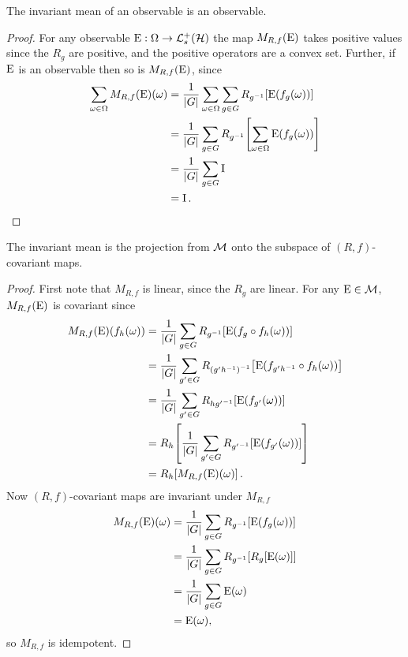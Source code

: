 \begin{lem}\label{lem:inv-mean-obs-to-obs}
  The invariant mean of an observable is an observable.
  \begin{proof}
    For any observable $\ope:\Omega\to\posops[\hcal]$ the map $M_{R,f}(\operatorname{E})$ takes positive values since the $R_g$ are positive, and the positive operators are a convex set. Further, if $\operatorname{E}$ is an observable then so is $M_{R,f}(\operatorname{E})$, since
    \begin{align}
      \sum_{\omega\in\Omega} M_{R,f}(\operatorname{E})(\omega) &= \frac{1}{{\left\lvert{G}\right\rvert}} \sum_{\omega\in\Omega} \sum_{g\in G} R_{g^{-1}}\! \left[\operatorname{E}(f_g(\omega))\right]\\
                                                   &= \frac{1}{{\left\lvert{G}\right\rvert}} \sum_{g\in G} R_{g^{-1}}\! \left[\sum_{\omega\in\Omega}\operatorname{E}(f_g(\omega))\right]\\
                                                   &= \frac{1}{{\left\lvert{G}\right\rvert}} \sum_{g\in G} \operatorname{I}\\
                                                   &= \operatorname{I}.
    \end{align}
  \end{proof}
\end{lem}
\begin{lem}\label{lem:inv-mean-proj}
  The invariant mean is the projection from $\mathcal{M}$ onto the subspace of $(R,f)$-covariant maps.
  \begin{proof}
    First note that $M_{R,f}$ is linear, since the $R_g$ are linear. For any $\operatorname{E}\in\mathcal{M}$, $M_{R,f}(\operatorname{E})$ is covariant since
    \begin{align}
      M_{R,f}(\operatorname{E})(f_h(\omega)) &= \frac{1}{{\left\lvert{G}\right\rvert}} \sum_{g\in G} R_{g^{-1}}\! \left[\operatorname{E}(f_g\circ f_h(\omega))\right]\\
                                 &= \frac{1}{{\left\lvert{G}\right\rvert}} \sum_{g^\prime\in G} R_{{(g^\prime h^{-1})}^{-1}}\! \left[\operatorname{E}(f_{g^\prime h^{-1}}\circ f_h(\omega))\right]\\
                                 &= \frac{1}{{\left\lvert{G}\right\rvert}} \sum_{g^\prime\in G} R_{h{g^\prime}^{-1}} \! \left[\operatorname{E}(f_{g^\prime}(\omega))\right]\\
                                 &= R_h\!\left[\frac{1}{{\left\lvert{G}\right\rvert}} \sum_{g^\prime\in G} R_{{g^\prime}^{-1}} \! \left[\operatorname{E}(f_{g^\prime}(\omega))\right]\right]\\
                                 &= R_h\!\left[M_{R,f}(\operatorname{E})(\omega)\right].
    \end{align}
    Now $(R,f)$-covariant maps are invariant under $M_{R,f}$
    \begin{align}
      M_{R,f}(\operatorname{E})(\omega) &= \frac{1}{{\left\lvert{G}\right\rvert}}\sum_{g\in G} R_{g^{-1}}\! \left[\operatorname{E}(f_g(\omega))\right]\\
                            &= \frac{1}{{\left\lvert{G}\right\rvert}}\sum_{g\in G} R_{g^{-1}}\! \left[R_{g}\!\left[\operatorname{E}(\omega)\right]\right]\\
                            &= \frac{1}{{\left\lvert{G}\right\rvert}}\sum_{g\in G} \operatorname{E}(\omega)\\
                            &= \operatorname{E}(\omega),
    \end{align}
    so $M_{R,f}$ is idempotent.
  \end{proof}
\end{lem}
